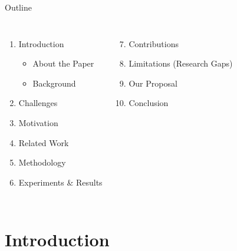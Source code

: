 \documentclass[aspectratio=169,11pt]{beamer}
\begin{document}
\begin{frame}{Outline}
\begin{columns}[T]
\begin{enumerate}
  \item Introduction
  \begin{itemize}
    \item \footnotesize About the Paper
    \item \footnotesize Background
  \end{itemize}
  \item Challenges
  \item Motivation
  \item Related Work
  \item Methodology
  \item Experiments \& Results
\end{enumerate}
\begin{enumerate}\setcounter{enumi}{6}
  \item Contributions
  \item Limitations (Research Gaps)
  \item Our Proposal
  \item Conclusion
\end{enumerate}
\end{columns}
\end{frame}

\section{Introduction}
\end{document}
